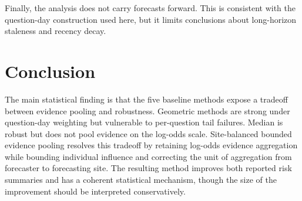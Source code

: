 \documentclass[
]{article}
\begin{document}
Finally, the analysis does not carry forecasts forward. This is
consistent with the question-day construction used here, but it limits
conclusions about long-horizon staleness and recency decay.

\section{Conclusion}\label{conclusion}

The main statistical finding is that the five baseline methods expose a
tradeoff between evidence pooling and robustness. Geometric methods are
strong under question-day weighting but vulnerable to per-question tail
failures. Median is robust but does not pool evidence on the log-odds
scale. Site-balanced bounded evidence pooling resolves this tradeoff by
retaining log-odds evidence aggregation while bounding individual
influence and correcting the unit of aggregation from forecaster to
forecasting site. The resulting method improves both reported risk
summaries and has a coherent statistical mechanism, though the size of
the improvement should be interpreted conservatively.
\end{document}
